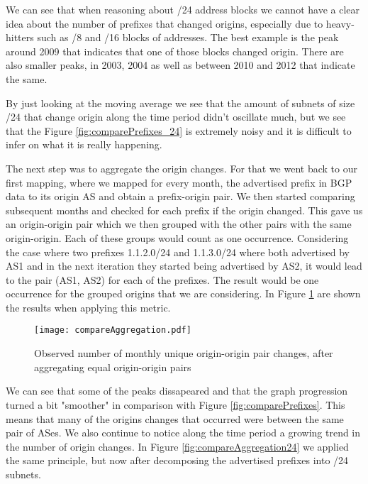 \documentclass[11pt,a4paper]{scrreprt}
\begin{document}
We can see that when reasoning about /24 address blocks we cannot have a clear idea about the number of prefixes that changed origins, especially due to heavy-hitters such as /8 and /16 blocks of addresses. The best example is the peak around 2009 that indicates that one of those blocks changed origin. There are also smaller peaks, in 2003, 2004 as well as between 2010 and 2012 that indicate the same. 

By just looking at the moving average we see that the amount of subnets of size /24 that change origin along the time period didn't oscillate much, but we see that the Figure \ref{fig:comparePrefixes_24} is extremely noisy and it is difficult to infer on what it is really happening.






The next step was to aggregate the origin changes. For that we went back to our first mapping, where we mapped for every month, the advertised prefix in BGP data to its origin AS and obtain a prefix-origin pair. We then started comparing subsequent months and checked for each prefix if the origin changed. This gave us an origin-origin pair 
which we then grouped with the other pairs with the same origin-origin. Each of these groups would count as one occurrence. Considering the case where two prefixes 1.1.2.0/24 and 1.1.3.0/24 where both advertised by AS1 and in the next iteration they started being advertised by AS2, it would lead to the pair (AS1, AS2) for each of the prefixes. The result would be one occurrence for the grouped origins that we are considering. In Figure \ref{fig:compareAggregation} are shown the results when applying this metric.       

\begin{figure}[!h]
\centering
\texttt{[image: compareAggregation.pdf]}
\caption{Observed number of monthly
unique origin-origin pair changes, after aggregating equal origin-origin pairs}
\label{fig:compareAggregation}
\end{figure}







We can see that some of the peaks dissapeared and that the graph progression turned a bit "smoother" in comparison with Figure \ref{fig:comparePrefixes}. This means that many of the origins changes that occurred were between the same pair of ASes. We also continue to notice along the time period a growing trend in the number of origin changes.
In Figure \ref{fig:compareAggregation24} we applied the same principle, but now after decomposing the advertised prefixes into /24 subnets. 
\end{document}
